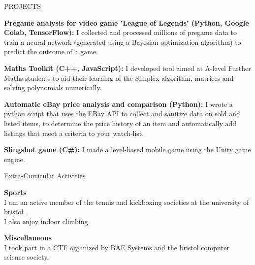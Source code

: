 \documentclass{resume} %
\begin{document}

\begin{rSection}{PROJECTS}
\vspace{-1.25em}

\item \textbf{Pregame analysis for video game 'League of Legends' (Python, Google Colab, TensorFlow):}
{I collected and processed millions of pregame data to train a neural network (generated using a Bayesian optimization algorithm) to predict the outcome of a game.}%

\item \textbf{Maths Toolkit (C++, JavaScript):} {I developed tool aimed at A-level Further Maths students to aid their learning of the Simplex algorithm, matrices and solving polynomials numerically.}

\item \textbf{Automatic eBay price analysis and comparison (Python):} {I wrote a python script that uses the EBay API to collect and sanitize data on sold and listed items, to determine the price history of an item and automatically add listings that meet a criteria to your watch-list.}

\item{\textbf{Slingshot game (C\#):}} {I made a level-based mobile game using the Unity game engine.}

\end{rSection}

\begin{rSection}{Extra-Curricular Activities} 
\vspace{-1.25em}

\item{\textbf{Sports}} \\
I am an active member of the tennis and kickboxing societies at the university of bristol. \\
I also enjoy indoor climbing

\item{\textbf{Miscellaneous}} \\
I took part in a CTF organized by BAE Systems and the bristol computer science society. \\



\end{rSection}
\end{document}
